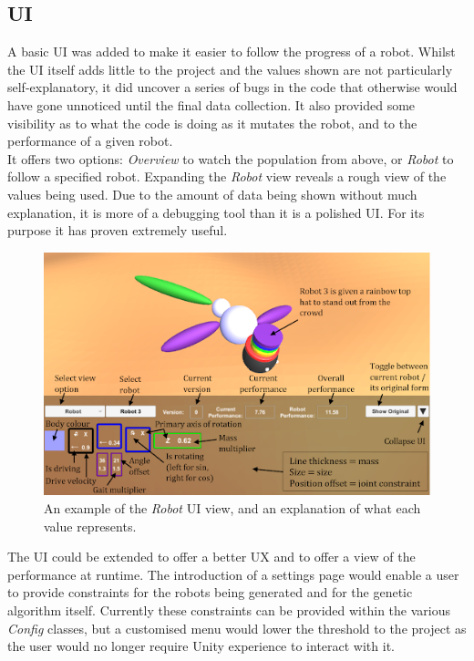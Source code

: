 \documentclass{article}
\begin{document}
\subsection{UI}
A basic UI was added to make it easier to follow the progress of a robot. Whilst the UI itself adds little to the project and the values shown are not particularly self-explanatory, it did uncover a series of bugs in the code that otherwise would have gone unnoticed until the final data collection. It also provided some visibility as to what the code is doing as it mutates the robot, and to the performance of a given robot.\\
It offers two options: \textit{Overview} to watch the population from above, or \textit{Robot} to follow a specified robot. Expanding the \textit{Robot} view reveals a rough view of the values being used. Due to the amount of data being shown without much explanation, it is more of a debugging tool than it is a polished UI. For its purpose it has proven extremely useful. 
\begin{figure}[H]
\centering
\centerline{\includegraphics[scale=0.8]{ui} }
\caption{An example of the \textit{Robot} UI view, and an explanation of what each value represents. }
\end{figure}
The UI could be extended to offer a better UX and to offer a view of the performance at runtime. The introduction of a settings page would enable a user to provide constraints for the robots being generated and for the genetic algorithm itself. Currently these constraints can be provided within the various \textit{Config} classes, but a customised menu would lower the threshold to the project as the user would no longer require Unity experience to interact with it. 

\newpage
\end{document}
